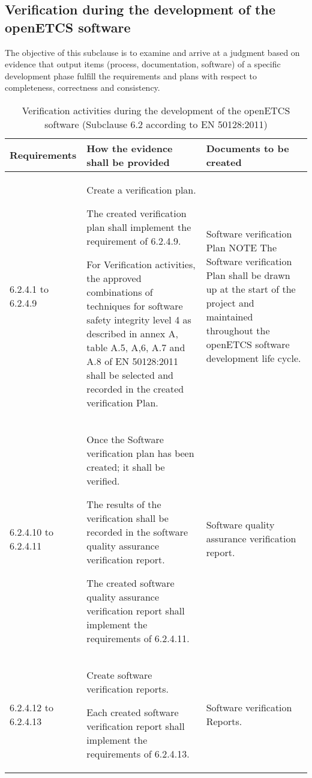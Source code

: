 \documentclass{template/openetcs_report}
\begin{document}
\subsection{Verification during the development of the openETCS software}
\begin{flushleft}
The objective of this subclause is to examine and arrive at a judgment based on evidence that output items (process, documentation, software) of a specific development phase fulfill the requirements and plans with respect to completeness, correctness and consistency.
\end{flushleft}
{\footnotesize\sffamily\centering
\begin{longtable}{|p{2cm}|p{9cm}|p{3cm}|}
\caption{Verification activities during the development of the openETCS software (Subclause 6.2 according to EN 50128:2011)}\\
\hline
\bfseries Requirements & \bfseries How the evidence shall be provided & \bfseries Documents to be created\\
\hline
\hline
\endhead
\hline
\endfoot

6.2.4.1 to 6.2.4.9 & Create a verification plan.

The created verification plan shall implement the requirement of 6.2.4.9.

For Verification activities, the approved combinations of techniques for software safety integrity level 4 as described in annex A, table A.5, A,6, A.7 and A.8 of EN 50128:2011 shall be selected and recorded in the created verification Plan.
& Software verification Plan
\linebreak
\linebreak
NOTE\linebreak
The Software verification Plan shall be drawn up at the start of the project and maintained throughout the openETCS software development life cycle.\\ 
\hline
6.2.4.10 to 6.2.4.11 & Once the Software verification plan has been created; it shall be verified.

The results of the verification shall be recorded in the software quality assurance verification report.

The created software quality assurance verification report shall implement the requirements of 6.2.4.11.
& Software quality assurance verification report.\\ 
\hline
6.2.4.12 to 6.2.4.13 & Create software verification reports.

Each created software verification report shall implement the requirements of 6.2.4.13.
& Software verification Reports.\\ 
\hline
\end{longtable}}
\end{document}
